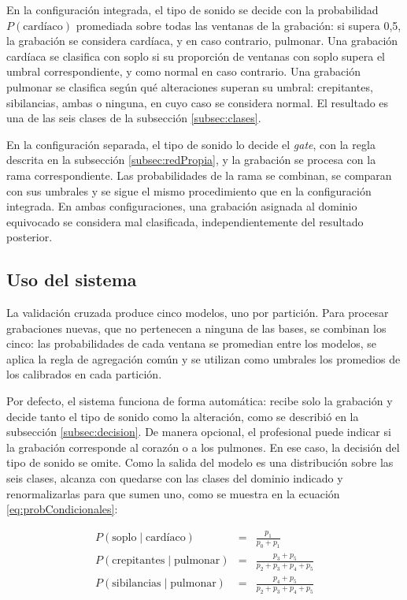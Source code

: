 En la configuración integrada, el tipo de sonido se decide con la probabilidad $P(\text{cardíaco})$
promediada sobre todas las ventanas de la grabación: si supera 0,5, la grabación se considera
cardíaca, y en caso contrario, pulmonar. Una grabación cardíaca se clasifica con soplo si su
proporción de ventanas con soplo supera el umbral correspondiente, y como normal en caso contrario.
Una grabación pulmonar se clasifica según qué alteraciones superan su umbral: crepitantes,
sibilancias, ambas o ninguna, en cuyo caso se considera normal. El resultado es una de las seis
clases de la subsección \ref{subsec:clases}.

En la configuración separada, el tipo de sonido lo decide el \textit{gate}, con la regla descrita
en la subsección \ref{subsec:redPropia}, y la grabación se procesa con la rama correspondiente. Las
probabilidades de la rama se combinan, se comparan con sus umbrales y se sigue el mismo
procedimiento que en la configuración integrada. En ambas configuraciones, una grabación asignada
al dominio equivocado se considera mal clasificada, independientemente del resultado posterior.

\subsection{Uso del sistema}
\label{subsec:usoSistema}

La validación cruzada produce cinco modelos, uno por partición. Para procesar grabaciones nuevas,
que no pertenecen a ninguna de las bases, se combinan los cinco: las probabilidades de cada ventana
se promedian entre los modelos, se aplica la regla de agregación común y se utilizan como umbrales
los promedios de los calibrados en cada partición.

Por defecto, el sistema funciona de forma automática: recibe solo la grabación y decide tanto el
tipo de sonido como la alteración, como se describió en la subsección \ref{subsec:decision}. De
manera opcional, el profesional puede indicar si la grabación corresponde al corazón o a los
pulmones. En ese caso, la decisión del tipo de sonido se omite. Como la salida del modelo es una
distribución sobre las seis clases, alcanza con quedarse con las clases del dominio indicado y
renormalizarlas para que sumen uno, como se muestra en la ecuación \ref{eq:probCondicionales}:

\begin{equation}
	\label{eq:probCondicionales}
	\begin{array}{rcl}
		P(\text{soplo} \mid \text{cardíaco}) & = & \displaystyle\frac{p_1}{p_0 + p_1} \\[3ex]
		P(\text{crepitantes} \mid \text{pulmonar}) & = &
			\displaystyle\frac{p_3 + p_5}{p_2 + p_3 + p_4 + p_5} \\[3ex]
		P(\text{sibilancias} \mid \text{pulmonar}) & = &
			\displaystyle\frac{p_4 + p_5}{p_2 + p_3 + p_4 + p_5}
	\end{array}
\end{equation}


